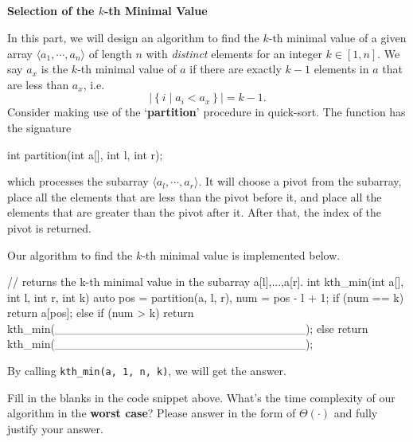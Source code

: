 
\begin{parts}
\part{} \textbf{Selection of the \(k\)-th Minimal Value} \par
In this part, we will design an algorithm to find the \(k\)-th minimal value of a given array \(\langle a_1,\cdots,a_n\rangle\) of length \(n\) with \emph{distinct} elements for an integer \(k\in[1,n]\). We say \(a_x\) is the \(k\)-th minimal value of \(a\) if there are exactly \(k-1\) elements in \(a\) that are less than \(a_x\), i.e.
\[\left|\left\{i\mid a_i<a_x\right\}\right|=k-1.\]
Consider making use of the `\textbf{partition}' procedure in quick-sort. The function has the signature
\begin{cpp}
  int partition(int a[], int l, int r);
\end{cpp}
which processes the subarray \(\langle a_l,\cdots,a_r\rangle\). It will choose a pivot from the subarray, place all the elements that are less than the pivot before it, and place all the elements that are greater than the pivot after it. After that, the index of the pivot is returned.

Our algorithm to find the \(k\)-th minimal value is implemented below.
\begin{cpp}
  // returns the k-th minimal value in the subarray a[l],...,a[r].
  int kth_min(int a[], int l, int r, int k) {
    auto pos = partition(a, l, r), num = pos - l + 1;
    if (num == k)
      return a[pos];
    else if (num > k)
      return kth_min(______________________________);
    else
      return kth_min(______________________________);
  }
\end{cpp}
By calling \lstinline{kth_min(a, 1, n, k)}, we will get the answer.

\begin{subparts}
    \subpart[2] Fill in the blanks in the code snippet above.
    \subpart[2] What's the time complexity of our algorithm in the \textbf{worst case}? Please answer in the form of \(\Theta(\cdot)\) and fully justify your answer.
    \begin{solution}
    \vspace{2.5in}
    \end{solution}
\end{subparts}


\end{parts}
